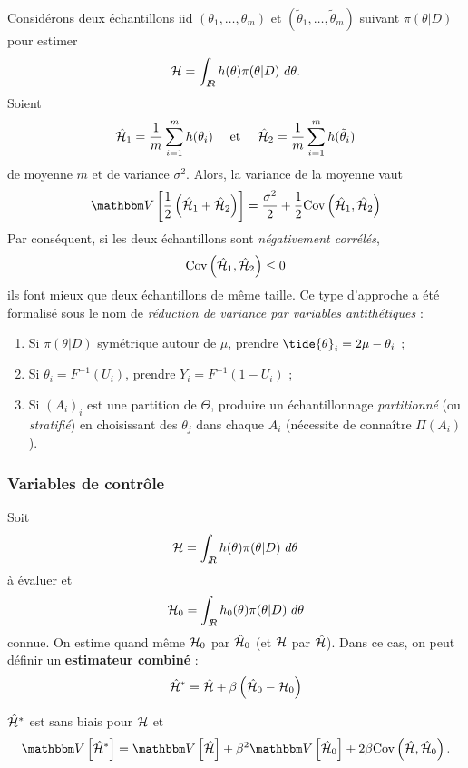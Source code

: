 Considérons deux échantillons iid $(\theta_1,\ldots,\theta_m)$ et $(\tilde{\theta}_1,\ldots,\tilde{\theta}_m)$ suivant $\pi(\theta|D)$ pour estimer
$$
{\cal{H}} = \int_{I\!\!R} h(\theta) \pi(\theta|D) \ d\theta.
$$
Soient
$$
\hat{\cal{H}}_1 = \frac{1}{m} \sum\limits_{i=1}^m h(\theta_i)  \ \ \  \ \text{et} \ \ \ \ \hat{\cal{H}}_2 = \frac{1}{m} \sum\limits_{i=1}^m h(\tilde{\theta}_i)
$$
de moyenne $m$ et de variance $\sigma^2$. Alors, la variance de la moyenne vaut
$$
\V\left[\frac{1}{2}\left(\hat{\cal{H}}_1+ \hat{\cal{H}}_2\right) \right]  = \frac{\sigma^2}{2} + \frac{1}{2} \mbox{Cov}\left(\hat{\cal{H}}_1,\hat{\cal{H}}_2 \right)
$$
Par conséquent, si les deux échantillons sont \emph{négativement corrélés}, 
$$
\mbox{Cov}\left(\hat{\cal{H}}_1,\hat{\cal{H}}_2 \right) \leq 0
$$
ils font mieux que deux échantillons de même taille. Ce type d'approche a été formalisé sous le nom de \emph{réduction de variance par variables antithétiques} :
\begin{enumerate}
\item Si $\pi(\theta|D)$ symétrique autour de $\mu$, prendre $\tide{\theta}_i = 2\mu- \theta_i$ ; 
\item Si $\theta_i = F^{-1}(U_i)$, prendre $Y_i = F^{-1}(1-U_i)$ ; 
\item Si $(A_i)_i$ est une partition de $\Theta$, produire un échantillonnage \emph{partitionné} (ou  \emph{stratifié}) en choisissant des $\theta_j$ dans chaque $A_i$ (nécessite de connaître $\Pi(A_i)$).
\end{enumerate}


\subsubsection{Variables de contrôle}

Soit
$$
{\cal{H}} = \int_{I\!\!R} h(\theta) \pi(\theta|D) \ d\theta
$$
à évaluer et 
$$
{\cal{H}}_0 = \int_{I\!\!R} h_0(\theta) \pi(\theta|D) \ d\theta
$$
connue. On estime quand même ${\cal{H}}_0$ par $\hat{\cal{H}}_0$ (et ${\cal{H}}$ par $\hat{\cal{H}}$). Dans ce cas, on peut définir un {\bf estimateur combiné} :
$$
\hat{\cal{H}}^* =  \hat{\cal{H}} + \beta\left(\hat{\cal{H}}_0-{\cal{H}}_0\right)
$$

\begin{proposition}
$\hat{\cal{H}}^*$ est sans biais pour ${\cal{H}}$ et 
$$
\V\left[\hat{\cal{H}}^* \right] = \V\left[\hat{\cal{H}} \right] + \beta^2  \V\left[\hat{\cal{H}}_0 \right] + 2\beta \mbox{Cov}\left(\hat{\cal{H}} ,\hat{\cal{H}}_0 \right).$$
\end{proposition}

